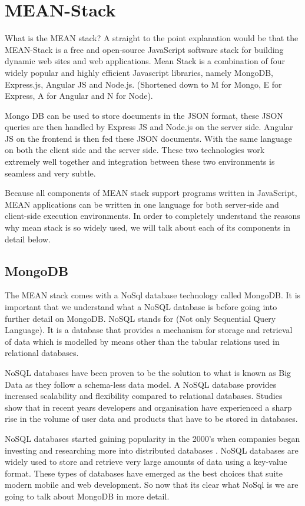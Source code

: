 \section{MEAN-Stack}
What is the MEAN stack? A straight to the point explanation would be that the MEAN-Stack is a free and open-source JavaScript software stack for building dynamic web sites and web applications. Mean Stack is a combination of four widely popular and highly efficient Javascript libraries, namely MongoDB, Express.js, Angular JS and Node.js. (Shortened down to M for Mongo, E for Express, A for Angular and N for Node). 

Mongo DB can be used to store documents in the JSON format, these JSON queries are then handled by Express JS and Node.js on the server side. Angular JS on the frontend is then fed these JSON documents. With the same language on both the client side and the server side. These two technologies work extremely well together and integration between these two environments is seamless and very subtle.\cite{Mean-Stack}

Because all components of MEAN stack support programs written in JavaScript, MEAN applications can be written in one language for both server-side and client-side execution environments. In order to completely understand the reasons why mean stack is so widely used, we will talk about each of its components in detail below. 

\subsection{MongoDB}
The MEAN stack comes with a NoSql database technology called MongoDB.
It is important that we understand what a NoSQL database is before going into further detail on MongoDB. NoSQL stands for (Not only Sequential Query Language). It is a database that provides a mechanism for storage and retrieval of data which is modelled by means other than the tabular relations used in relational databases. 

NoSQL databases have been proven to be the solution to what is
known as Big Data as they follow a schema-less data model. A NoSQL database provides increased scalability and flexibility compared to relational databases. Studies show that in recent years developers and organisation have experienced a sharp rise in the volume of user data and products that have to be stored in databases. 

NoSQL databases started gaining popularity in the 2000’s when companies began investing and researching more into distributed databases \cite{no}.
NoSQL databases are widely used to store and retrieve very large amounts
of data using a key-value format. These types of databases have emerged
as the best choices that suite modern mobile and web development. So now that its clear what NoSql is we are going to talk about MongoDB in more detail.

